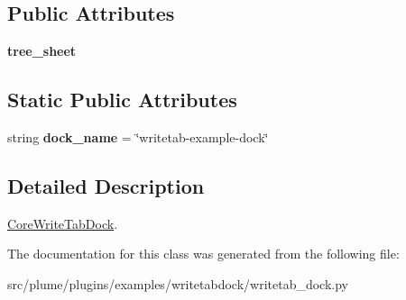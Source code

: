 \subsection*{Public Attributes}
\begin{DoxyCompactItemize}
\item 
{\bfseries tree\+\_\+sheet}\hypertarget{classplume-creator_1_1src_1_1plume_1_1plugins_1_1examples_1_1writetabdock_1_1writetab__dock_1_1_core_write_tab_dock_a329600fc8e4cc32ab708927480b5a1e7}{}\label{classplume-creator_1_1src_1_1plume_1_1plugins_1_1examples_1_1writetabdock_1_1writetab__dock_1_1_core_write_tab_dock_a329600fc8e4cc32ab708927480b5a1e7}

\end{DoxyCompactItemize}
\subsection*{Static Public Attributes}
\begin{DoxyCompactItemize}
\item 
string {\bfseries dock\+\_\+name} = \char`\"{}writetab-\/example-\/dock\char`\"{}\hypertarget{classplume-creator_1_1src_1_1plume_1_1plugins_1_1examples_1_1writetabdock_1_1writetab__dock_1_1_core_write_tab_dock_afae4af161b972cb72366698d10d6cb75}{}\label{classplume-creator_1_1src_1_1plume_1_1plugins_1_1examples_1_1writetabdock_1_1writetab__dock_1_1_core_write_tab_dock_afae4af161b972cb72366698d10d6cb75}

\end{DoxyCompactItemize}


\subsection{Detailed Description}
\hyperlink{classplume-creator_1_1src_1_1plume_1_1plugins_1_1examples_1_1writetabdock_1_1writetab__dock_1_1_core_write_tab_dock}{Core\+Write\+Tab\+Dock}. 

The documentation for this class was generated from the following file\+:\begin{DoxyCompactItemize}
\item 
src/plume/plugins/examples/writetabdock/writetab\+\_\+dock.\+py\end{DoxyCompactItemize}
